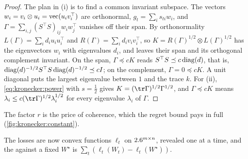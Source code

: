 \begin{refsection}

\begin{proof}
The plan in (i) is to find a common invariant subspace. The vectors $w_i=v_i\otimes u_i=\operatorname{vec}(u_iv_i^\top)$ are orthonormal, $g_t=\sum_is_{ti}w_i$, and $\Gamma=\sum_{i,j}(S^\top S)_{ij}w_iw_j^\top$ vanishes off their span. By orthonormality $L(\Gamma)=\sum_id_iu_iu_i^\top$ and $R(\Gamma)=\sum_id_iv_iv_i^\top$, so $K=R(\Gamma)^{1/2}\otimes L(\Gamma)^{1/2}$ has the eigenvectors $w_i$ with eigenvalues $d_i$, and leaves their span and its orthogonal complement invariant. On the span, $\Gamma\preceq cK$ reads $S^\top S\preceq c\operatorname{diag}(d)$, that is, $\operatorname{diag}(d)^{-1/2}S^\top S\operatorname{diag}(d)^{-1/2}\preceq cI$; on the complement, $\Gamma=0\preceq cK$. A unit diagonal puts the largest eigenvalue between $1$ and the trace $k$. For (ii), \eqref{eq:kronecker:power} with $s=\frac12$ gives $K=(\tr\Gamma)^{1/2}\Gamma^{1/2}$, and $\Gamma\preceq cK$ means $\lambda_i\le c(\tr\Gamma)^{1/2}\lambda_i^{1/2}$ for every eigenvalue $\lambda_i$ of $\Gamma$.
\end{proof}

The factor $r$ is the price of coherence, which the regret bound pays in full (\cref{fig:kronecker:constant}).

The losses are now convex functions $\ell_t$ on $2.6^{m\times n}$, revealed one at a time, and the  against a fixed $W^\star$ is $\sum_t(\ell_t(W_t)-\ell_t(W^\star))$.


\end{refsection}

